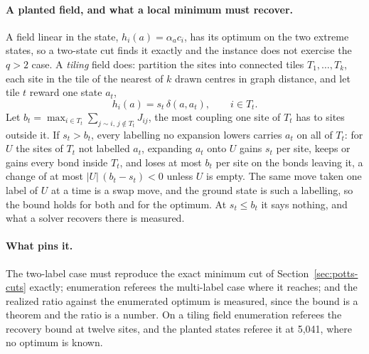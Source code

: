 \documentclass[11pt,a4paper]{article}
\begin{document}
\paragraph{A planted field, and what a local minimum must recover.}
\label{par:alpha-expansion:tiling}
A field linear in the state, $h_i(a) = \alpha_a c_i$, has its optimum on the
two extreme states, so a two-state cut finds it exactly and the instance does
not exercise the $q > 2$ case. A \emph{tiling} field does: partition the sites
into connected tiles $T_1, \dots, T_k$, each site in the tile of the nearest of
$k$ drawn centres in graph distance, and let tile $t$ reward one state $a_t$,
\begin{equation}
  h_i(a) = s_t\,\delta(a, a_t), \qquad i \in T_t .
  \label{eq:tiling-field}
\end{equation}
Let $b_t = \max_{i \in T_t} \sum_{j \sim i,\, j \notin T_t} J_{ij}$, the most
coupling one site of $T_t$ has to sites outside it. If $s_t > b_t$, every
labelling no expansion lowers carries $a_t$ on all of $T_t$: for $U$ the sites
of $T_t$ not labelled $a_t$, expanding $a_t$ onto $U$ gains $s_t$ per site,
keeps or gains every bond inside $T_t$, and loses at most $b_t$ per site on the
bonds leaving it, a change of at most $|U|\,(b_t - s_t) < 0$ unless $U$ is
empty. The same move taken one label of $U$ at a time is a swap move, and the
ground state is such a labelling, so the bound holds for both and for the
optimum. At $s_t \le b_t$ it says nothing, and what a solver recovers there is
measured.

\paragraph{What pins it.}
The two-label case must reproduce the exact minimum cut of
Section~\ref{sec:potts-cuts} exactly; enumeration referees the multi-label
case where it reaches; and the realized ratio against the enumerated optimum
is measured, since the bound is a theorem and the ratio is a number. On a
tiling field enumeration referees the recovery bound at twelve sites, and the
planted states referee it at 5,041, where no optimum is known.
\end{document}
